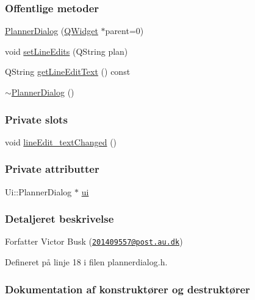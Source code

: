 \subsubsection*{Offentlige metoder}
\begin{DoxyCompactItemize}
\item 
\hyperlink{class_planner_dialog_a2f5d2ba887c4b70a3f28d78955aa1536}{Planner\+Dialog} (\hyperlink{class_q_widget}{Q\+Widget} $\ast$parent=0)
\item 
void \hyperlink{class_planner_dialog_a83441caf32a5806cfbb5f0796065d352}{set\+Line\+Edits} (Q\+String plan)
\item 
Q\+String \hyperlink{class_planner_dialog_a7c9482ec9a38bf3d4a90dadf6dc3f572}{get\+Line\+Edit\+Text} () const 
\item 
\hyperlink{class_planner_dialog_a24842220c2a6f2dde621b5ef0bde0217}{$\sim$\+Planner\+Dialog} ()
\end{DoxyCompactItemize}
\subsubsection*{Private slots}
\begin{DoxyCompactItemize}
\item 
void \hyperlink{class_planner_dialog_ad59b9da096cc8570abaf6156512b10a8}{line\+Edit\+\_\+text\+Changed} ()
\end{DoxyCompactItemize}
\subsubsection*{Private attributter}
\begin{DoxyCompactItemize}
\item 
Ui\+::\+Planner\+Dialog $\ast$ \hyperlink{class_planner_dialog_a230ac8ce9ff95f43557ac406c5e4fcc6}{ui}
\end{DoxyCompactItemize}


\subsubsection{Detaljeret beskrivelse}
\begin{DoxyAuthor}{Forfatter}
Victor Busk (\href{mailto:201409557@post.au.dk}{\tt 201409557@post.\+au.\+dk}) 
\end{DoxyAuthor}


Defineret på linje 18 i filen plannerdialog.\+h.



\subsubsection{Dokumentation af konstruktører og destruktører}
